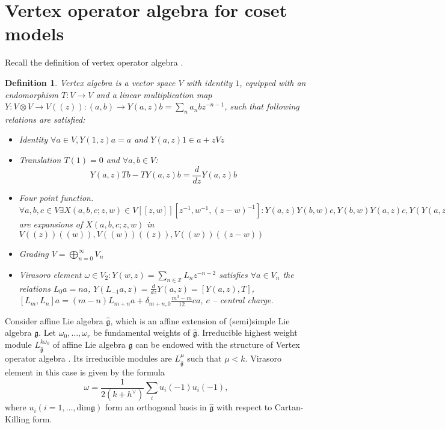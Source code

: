 \documentclass[12pt]{article}
\newtheorem{Def}{Definition}[section]
\newcommand{\gf}{\mathfrak{g}}
\newcommand{\gfh}{\hat{\mathfrak{g}}}
\begin{document}
\section{Vertex operator algebra for coset models}
\label{sec:vert-oper-algebra}

Recall the definition of vertex operator algebra \cite{borcherds1986vertex,kac1998vertex,frenkel2001vertex,frenkel1988vertex}.
\begin{Def}
  Vertex algebra is a  vector space $V$ with identity $1$, equipped with an endomorphism
  $T:V\to V$ and a linear multiplication map $Y:V\otimes V\to V((z)):
  (a,b)\to Y(a,z)b=\sum_n a_n b z^{-n-1}$,
  such that following relations are satisfied:
  \begin{itemize}
  \item {\it Identity} $\forall a\in V, Y(1,z) a =a$ and $Y(a,z) 1 \in a+z V z$
  \item {\it Translation} $T(1)=0$ and $\forall a,b\in V$:
    $$Y(a,z)T b - T Y(a,z) b =
    \frac{d}{dz} Y(a,z) b$$
  \item {\it Four point function}. $\forall a,b,c\in V \exists
    X(a,b,c;z,w)\in V[[z,w]][z^{-1},w^{-1},(z-w)^{-1}]: Y(a,z)Y(b,w)c,
    Y(b,w)Y(a,z)c, Y(Y(a,z-w)b,w)c$ are expansions of $X(a,b,c;z,w)$
    in $V((z))((w)), V((w))((z)), V((w))((z-w))$
  \item {\it Grading} $V=\bigoplus_{n=0}^{\infty} V_n$
  \item {\it Virasoro element} $\omega\in V_2: Y(w,z)=\sum_{n\in
      \mathbb{Z}} L_n z^{-n-2}$ satisfies $\forall a\in V_n$ the
      relations $L_0 a =n a$,
      $Y(L_{-1}a,z)=\frac{d}{dz}Y(a,z)=[Y(a,z),T]$,
      $[L_m,L_n]a=(m-n)L_{m+n} a + \delta_{m+n,0} \frac{m^3 -
        m}{12}ca$, $c$ -- central charge.
  \end{itemize}

\end{Def}

Consider affine Lie algebra $\gfh$, which is an affine extension of (semi)simple Lie algebra $\gf$.
Let $\omega_{0},\dots,\omega_{r}$ be fundamental weights of $\gfh$. Irreducible highest weight module $L^{k\omega_0}_{\gfh}$ of affine Lie algebra $\gfh$ can be endowed with the structure of Vertex operator algebra \cite{frenkel1992vertex}. Its irreducible modules are $L^{\mu}_{\gfh}$ such that $\mu<k$.  Virasoro element in this case is given by the formula
\begin{equation}
  \label{eq:2}
  \omega=\frac{1}{2(k+h^{\vee})}\sum_i u_i(-1) u_i(-1),
\end{equation}
where $u_i (i=1,\dots,\mathrm{dim}\gf)$  form an orthogonal basis in $\gfh$ with respect to Cartan-Killing form. 
\end{document}
